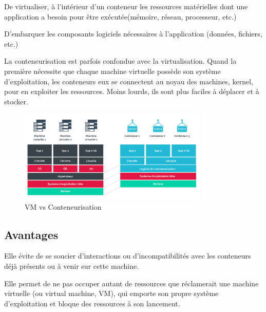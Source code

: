 \begin{list}{•}
	\item De virtualiser, à l’intérieur d’un conteneur les ressources matérielles dont une application a besoin pour être exécutée(mémoire, réseau, processeur, etc.) 
	\item
	\item D'embarquer les composants logiciels nécessaires à l’application (données, fichiers, etc.)  
\end{list}

La conteneurisation est parfois confondue avec la virtualisation. Quand la première nécessite que chaque machine virtuelle possède 
son système d’exploitation, les conteneurs eux se connectent au noyau des machines, kernel, pour en exploiter les ressources. 
Moins lourds, ils sont plus faciles à déplacer et à stocker. 
 \begin{figure}[!th]
            \centering
                \includegraphics[width=0.8\textwidth]{Figures/virtualvscont}
	       \decoRule
		\caption[VM vs Conteneurisation]{VM vs Conteneurisation}
   \label{fig:VM vs Conteneurisation}
\end{figure}

\subsection{Avantages}
\begin{list}{•}
	\item Elle évite de se soucier d’interactions ou d’incompatibilités avec les conteneurs déjà présents ou à
	venir sur cette machine.
	\item 
	\item Elle permet de ne pas occuper autant de ressources que réclamerait une machine virtuelle (ou virtual machine, VM), qui emporte son propre système d’exploitation et bloque des ressources à son
	lancement.
\end{list}
